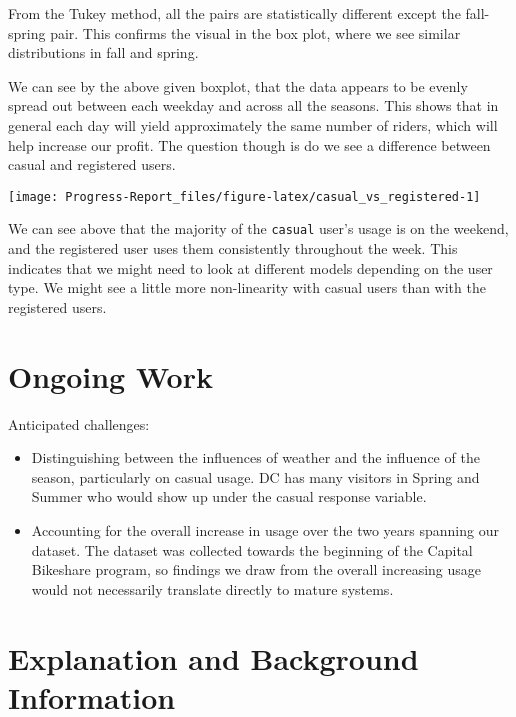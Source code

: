 \documentclass[
  11pt,
]{article}
\providecommand{\tightlist}{%
  \setlength{\itemsep}{0pt}\setlength{\parskip}{0pt}}
\begin{document}
From the Tukey method, all the pairs are statistically different except
the fall-spring pair. This confirms the visual in the box plot, where we
see similar distributions in fall and spring.

We can see by the above given boxplot, that the data appears to be
evenly spread out between each weekday and across all the seasons. This
shows that in general each day will yield approximately the same number
of riders, which will help increase our profit. The question though is
do we see a difference between casual and registered users.

\begin{center}\texttt{[image: Progress-Report\_files/figure-latex/casual\_vs\_registered-1]} \end{center}

We can see above that the majority of the \texttt{casual} user's usage
is on the weekend, and the registered user uses them consistently
throughout the week. This indicates that we might need to look at
different models depending on the user type. We might see a little more
non-linearity with casual users than with the registered users.

\hypertarget{ongoing-work}{%
\section{Ongoing Work}\label{ongoing-work}}

Anticipated challenges:

\begin{itemize}
\tightlist
\item
  Distinguishing between the influences of weather and the influence of
  the season, particularly on casual usage. DC has many visitors in
  Spring and Summer who would show up under the casual response
  variable.
\item
  Accounting for the overall increase in usage over the two years
  spanning our dataset. The dataset was collected towards the beginning
  of the Capital Bikeshare program, so findings we draw from the overall
  increasing usage would not necessarily translate directly to mature
  systems.
\end{itemize}

\hypertarget{explanation-and-background-information}{%
\section{Explanation and Background
Information}\label{explanation-and-background-information}}
\end{document}
